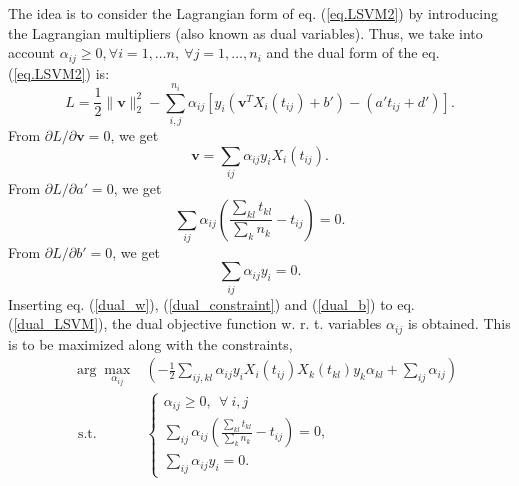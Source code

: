 \documentclass[12pt,a4paper]{article}%
\newcommand{\wv}{\mathbf{w}}
\newcommand{\vv}{\mathbf{v}}
\begin{document}
The idea is to consider the Lagrangian form of eq. (\ref{eq.LSVM2}) by introducing the Lagrangian multipliers (also known as dual variables).
Thus, we take into account $\alpha_{ij} \geq 0, \forall i=1, \dots n, \ \forall j=1, \dots, n_i $ and the dual form of the eq. (\ref{eq.LSVM2}) is:
\begin{equation}
L =\frac{1}{2}\|\vv\|_2^2 - \sum_{i,j}^{n_i}\alpha_{ij} \left[y_i
\left(\vv^TX_i(t_{ij})+b' \right)-(a't_{ij}+d')\right].
\label{dual_LSVM}
\end{equation}
From $\partial L/\partial \vv = 0$, we get
\begin{equation}
\vv  = \sum_{ij}\alpha_{ij}y_iX_i(t_{ij}).
\label{dual_w}
\end{equation}
From $\partial L/\partial a' = 0$, we get
\begin{equation}
 \sum_{ij}\alpha_{ij}\left(\frac{\sum_{kl}t_{kl}}{\sum_k n_k}-t_{ij}\right) = 0.
 \label{dual_constraint}
\end{equation}
From $\partial L/\partial b'= 0$, we get
\begin{equation}
 \sum_{ij}\alpha_{ij}y_i = 0.
 \label{dual_b}
\end{equation}
Inserting eq. (\ref{dual_w}), (\ref{dual_constraint}) and (\ref{dual_b})  to eq. (\ref{dual_LSVM}),
the dual objective function w. r. t. variables $\alpha_{ij}$ is obtained. This is to be maximized along with the constraints,
\begin{eqnarray}
 &\arg\max_{\alpha_{ij}} &\left(-\frac{1}{2}\sum_{ij,kl}\alpha_{ij}y_iX_{i}(t_{ij})X_{k}(t_{kl})y_k\alpha_{kl}+\sum_{ij}\alpha_{ij}\right) \nonumber
	\\
	&\mbox{ \ s.t. \ }&
	\begin{cases}
 	\alpha_{ij} \geq 0, \ \ \forall~ i,j & \\		
	\sum_{ij}\alpha_{ij}\left(\frac{\sum_{kl} t_{kl}}{\sum_k n_k}-t_{ij}\right) = 0, &\\
	\sum_{ij}\alpha_{ij}y_i = 0. &
	\end{cases}
	\label{eq.dual_LSVM2}
\end{eqnarray}
\end{document}
